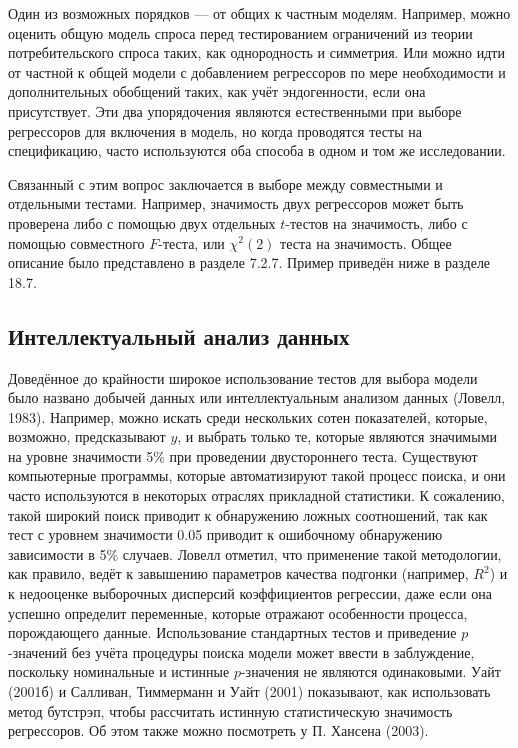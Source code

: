 Один из возможных порядков ---  от общих к частным моделям. Например, можно оценить общую модель спроса перед тестированием ограничений из теории потребительского спроса таких, как однородность и симметрия. Или  можно идти от частной к общей модели с добавлением регрессоров по мере необходимости и дополнительных обобщений таких, как учёт  эндогенности, если она присутствует. Эти два упорядочения являются естественными при выборе регрессоров для включения в модель, но когда проводятся тесты на спецификацию, часто используются оба способа в одном и том же исследовании.

Связанный с этим вопрос заключается в выборе между совместными и отдельными тестами. Например, значимость двух регрессоров может быть проверена либо с помощью двух отдельных $t$-тестов на значимость, либо с помощью совместного $F$-теста, или $\chi^2(2)$ теста на значимость. Общее описание было представлено в разделе 7.2.7. Пример приведён ниже в разделе 18.7.

\subsection{Интеллектуальный анализ данных}

Доведённое до крайности широкое использование тестов для выбора модели было названо добычей данных или интеллектуальным анализом данных (Ловелл, 1983). Например, можно искать среди нескольких сотен показателей, которые, возможно, предсказывают $y$, и выбрать только те, которые являются значимыми на уровне значимости 5\% при проведении двустороннего теста. Существуют компьютерные программы, которые автоматизируют такой процесс поиска, и они часто используются в некоторых отраслях прикладной статистики. К сожалению, такой широкий поиск приводит к обнаружению ложных соотношений, так как тест с уровнем значимости 0.05 приводит к ошибочному обнаружению зависимости в 5\% случаев. Ловелл отметил, что применение такой методологии, как правило, ведёт к завышению параметров качества подгонки (например, $R^2$) и к недооценке выборочных дисперсий коэффициентов регрессии, даже если она успешно определит переменные, которые отражают особенности процесса, порождающего данные. Использование стандартных тестов и приведение $p$-значений без учёта процедуры поиска модели может ввести в заблуждение, поскольку номинальные и истинные $p$-значения не являются одинаковыми. Уайт (2001б) и Салливан, Тиммерманн и Уайт (2001) показывают, как использовать метод бутстрэп, чтобы рассчитать истинную статистическую значимость регрессоров. Об этом также можно посмотреть у П. Хансена (2003).


